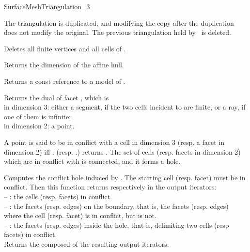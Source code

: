 \begin{ccRefConcept}{SurfaceMeshTriangulation_3}

{The triangulation  is duplicated, and modifying the copy after the 
duplication does not modify the original. The previous triangulation held
by \ccVar\ is deleted.}

{Deletes all finite vertices and all cells of \ccVar.}

\ccAccessFunctions

{Returns the dimension of the affine hull.}

{Returns a const reference to a model of
  .}


{Returns the dual of facet , which is \\
in dimension 3: either a segment, if the two cells incident to   
are finite, or a ray, if one of them is infinite;\\
in dimension 2: a point.}


A point  is said to be in conflict with a cell  in dimension 3
(resp. a facet  in dimension 2) iff \ccVar.
(resp. \ccVar.) returns .
The set of cells (resp. facets in dimension 2) which are in conflict with
 is connected, and it forms a hole.

{Computes the  conflict hole induced by .  The starting cell
(resp.  facet)  must be in conflict.
Then this function returns respectively in the output iterators:\\
-- : the cells (resp. facets) in conflict.\\
-- : the facets (resp. edges) on the boundary, that is, the facets
(resp. edges)  where the cell (resp. facet)  is in
conflict, but  is not.\\
-- : the facets (resp. edges) inside the hole, that is, delimiting
two cells (resp facets) in conflict.\\
Returns the  composed of the resulting output iterators.}


\end{ccRefConcept}
